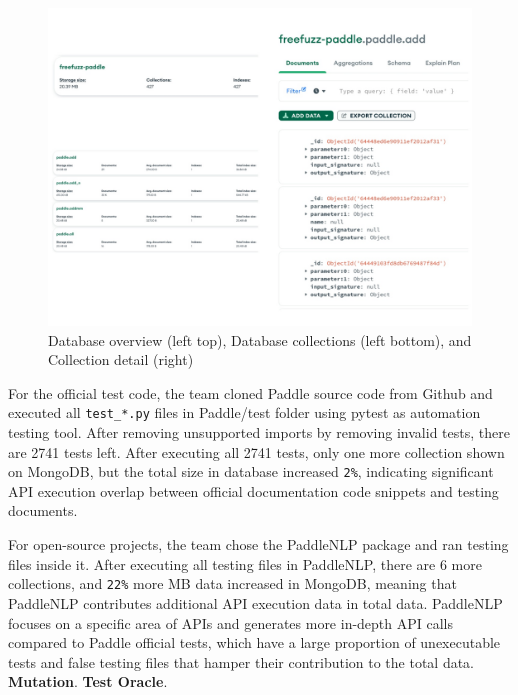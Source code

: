 \documentclass[sigconf]{acmart}
\begin{document}
  \begin{figure}[h]
    \centering
    \includegraphics[width=\linewidth]{3.png}
    \caption{Database overview (left top), Database collections (left bottom), and Collection detail (right)}
  \end{figure}

  \par For the official test code, the team cloned Paddle source code from Github and executed all \verb|test_*.py| files in Paddle/test folder using pytest as automation testing tool. 
  After removing unsupported imports by removing invalid tests, there are 2741 tests left. After executing all 2741 tests, only one more collection shown on MongoDB, but the total size in database increased  \verb|2%|, 
  indicating significant API execution overlap between official documentation code snippets and testing documents.

  \par For open-source projects, the team chose the PaddleNLP package and ran testing files inside it. After executing all testing files in PaddleNLP, there are 6 more collections, and \verb|22%| more MB data increased in MongoDB, 
  meaning that PaddleNLP contributes additional API execution data in total data. PaddleNLP focuses on a specific area of APIs and generates more in-depth API calls compared to Paddle official tests, 
  which have a large proportion of unexecutable tests and false testing files that hamper their contribution to the total data.
  \newline \textbf{Mutation}.
  \newline \textbf{Test Oracle}.
  
\end{document}
